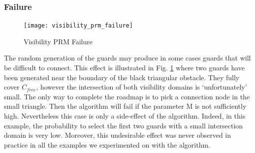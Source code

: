 \documentclass[11pt]{article}
\begin{document}
\subsubsection{Failure}
\begin{figure}[h]
\texttt{[image: visibility\_prm\_failure]}
\centering
\caption{Visibility PRM Failure}
\label{fig:visprm_failure}
\end{figure}
The random generation of the guards may produce in some cases guards that will
be difficult to connect. This effect is illustrated in Fig. \ref{fig:visprm_failure} where two guards have
been generated near the boundary of the black triangular obstacle. They fully cover
$C_{free}$, however the intersection of both visibility domains is ‘unfortunately’ small.
The only way to complete the roadmap is to pick a connection node in the small
triangle. Then the algorithm will fail if the parameter M is not sufficiently high. Nevertheless this case is only a side-effect of the algorithm. Indeed, in this example,
the probability to select the first two guards with a small intersection domain is very
low. Moreover, this undesirable effect was never observed in practice in all the
examples we experimented on with the algorithm.
\end{document}
